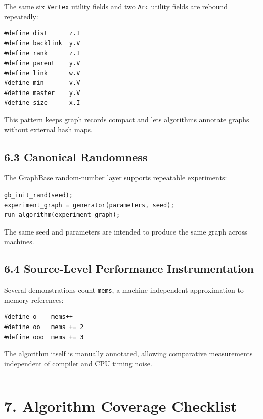 \documentclass[11pt]{article}
\begin{document}
The same six \texttt{Vertex} utility fields and two \texttt{Arc} utility fields are rebound repeatedly:

\begin{verbatim}
#define dist      z.I
#define backlink  y.V
#define rank      z.I
#define parent    y.V
#define link      w.V
#define min       v.V
#define master    y.V
#define size      x.I
\end{verbatim}

This pattern keeps graph records compact and lets algorithms annotate graphs without external hash maps.

\subsection{6.3 Canonical Randomness}\label{canonical-randomness}

The GraphBase random-number layer supports repeatable experiments:

\begin{verbatim}
gb_init_rand(seed);
experiment_graph = generator(parameters, seed);
run_algorithm(experiment_graph);
\end{verbatim}

The same seed and parameters are intended to produce the same graph across machines.

\subsection{6.4 Source-Level Performance Instrumentation}\label{source-level-performance-instrumentation}

Several demonstrations count \texttt{mems}, a machine-independent approximation to memory references:

\begin{verbatim}
#define o    mems++
#define oo   mems += 2
#define ooo  mems += 3
\end{verbatim}

The algorithm itself is manually annotated, allowing comparative measurements independent of compiler and CPU timing noise.

\begin{center}\rule{0.5\linewidth}{0.5pt}\end{center}

\section{7. Algorithm Coverage Checklist}\label{algorithm-coverage-checklist}
\end{document}
